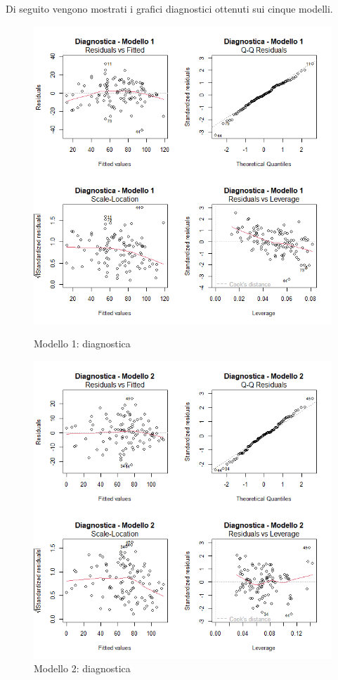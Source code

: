 Di seguito vengono mostrati i grafici diagnostici ottenuti sui cinque modelli.
\begin{figure}[H]
	\centering
	\begin{minipage}{0.48\textwidth}
		\centering
		\includegraphics[width=\linewidth]{../graphs/diagnostica/modello1}
		\caption{Modello 1: diagnostica}
		\label{fig:diagnostica_modello1}
	\end{minipage}
	\hfill
	\begin{minipage}{0.48\textwidth}
		\centering
		\includegraphics[width=\linewidth]{../graphs/diagnostica/modello2}
		\caption{Modello 2: diagnostica}
		\label{fig:diagnostica_modello2}
	\end{minipage}
\end{figure}

